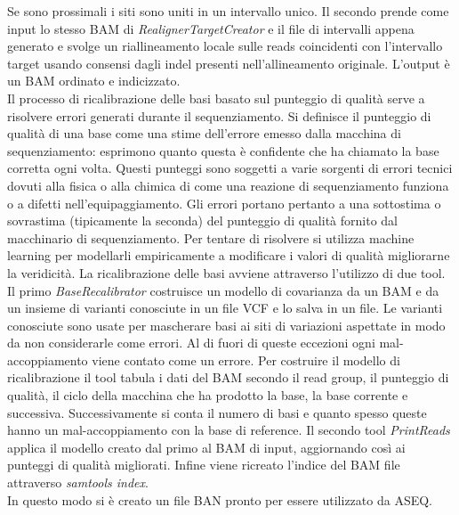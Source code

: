     Se sono prossimali i siti sono uniti in un intervallo unico.
    Il secondo prende come input lo stesso BAM di \emph{RealignerTargetCreator} e il file di intervalli appena generato e svolge un riallineamento locale sulle reads coincidenti con l'intervallo target usando consensi dagli indel presenti nell'allineamento originale.
    L'output \`e un BAM ordinato e indicizzato.\\
    Il processo di ricalibrazione delle basi basato sul punteggio di qualit\`a serve a risolvere errori generati durante il sequenziamento.
    Si definisce il punteggio di qualit\`a di una base come una stime dell'errore emesso dalla macchina di sequenziamento: esprimono quanto questa \`e confidente che ha chiamato la base corretta ogni volta.
    Questi punteggi sono soggetti a varie sorgenti di errori tecnici dovuti alla fisica o alla chimica di come una reazione di sequenziamento funziona o a difetti nell'equipaggiamento.
    Gli errori portano pertanto a una sottostima o sovrastima (tipicamente la seconda) del punteggio di qualit\`a fornito dal macchinario di sequenziamento.
    Per tentare di risolvere si utilizza machine learning per modellarli empiricamente a modificare i valori di qualit\`a migliorarne la veridicit\`a.
    La ricalibrazione delle basi avviene attraverso l'utilizzo di due tool.
    Il primo \emph{BaseRecalibrator} costruisce un modello di covarianza da un BAM e da un insieme di varianti conosciute in un file VCF e lo salva in un file.
    Le varianti conosciute sono usate per mascherare basi ai siti di variazioni aspettate in modo da non considerarle come errori.
    Al di fuori di queste eccezioni ogni mal-accoppiamento viene contato come un errore.
    Per costruire il modello di ricalibrazione il tool tabula i dati del BAM secondo il read group, il punteggio di qualit\`a, il ciclo della macchina che ha prodotto la base, la base corrente e successiva.
    Successivamente si conta il numero di basi e quanto spesso queste hanno un mal-accoppiamento con la base di reference.
    Il secondo tool \emph{PrintReads} applica il modello creato dal primo al BAM di input, aggiornando cos\`i ai punteggi di qualit\`a migliorati.
    Infine viene ricreato l'indice del BAM file attraverso \emph{samtools index}.\\
    In questo modo si \`e creato un file BAN pronto per essere utilizzato da ASEQ.

